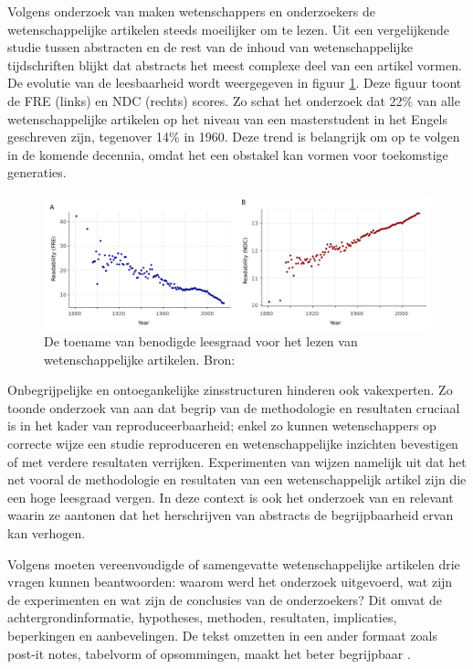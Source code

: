 \medspace

Volgens onderzoek van \textcite{PlavenSigray2017} maken wetenschappers en onderzoekers de wetenschappelijke artikelen steeds moeilijker om te lezen. Uit een vergelijkende studie tussen abstracten en de rest van de inhoud van wetenschappelijke tijdschriften blijkt dat abstracts het meest complexe deel van een artikel vormen. De evolutie van de leesbaarheid wordt weergegeven in figuur \ref{img:fre-ndc}. Deze figuur toont de FRE (links) en NDC (rechts) scores. Zo schat het onderzoek dat 22\% van alle wetenschappelijke artikelen op het niveau van een masterstudent in het Engels geschreven zijn, tegenover 14\% in 1960. Deze trend is belangrijk om op te volgen in de komende decennia, omdat het een obstakel kan vormen voor toekomstige generaties.

\begin{figure}[H]
	\includegraphics[width=\linewidth]{img/fre-ndc.png}
	\caption{De toename van benodigde leesgraad voor het lezen van wetenschappelijke artikelen. Bron: \autocite{PlavenSigray2017}}
	\label{img:fre-ndc}
\end{figure}

Onbegrijpelijke en ontoegankelijke zinsstructuren hinderen ook vakexperten. Zo toonde onderzoek van \textcite{McNutt2014} aan dat begrip van de methodologie en resultaten cruciaal is in het kader van reproduceerbaarheid; enkel zo kunnen wetenschappers op correcte wijze een studie reproduceren en wetenschappelijke inzichten bevestigen of met verdere resultaten verrijken. Experimenten van \textcite{Hubbard2017} wijzen namelijk uit dat het net vooral de methodologie en resultaten van een wetenschappelijk artikel zijn die een hoge leesgraad vergen. In deze context is ook het onderzoek van \textcite{Hartley1999} en \textcite{Snow2010} relevant waarin ze aantonen dat het herschrijven van abstracts de begrijpbaarheid ervan kan verhogen.

\medspace

Volgens \textcite{Hollenkamp2020, McCombes2022} moeten vereenvoudigde of samengevatte wetenschappelijke artikelen drie vragen kunnen beantwoorden: waarom werd het onderzoek uitgevoerd, wat zijn de experimenten en wat zijn de conclusies van de onderzoekers? Dit omvat de achtergrondinformatie, hypotheses, methoden, resultaten, implicaties, beperkingen en aanbevelingen. De tekst omzetten in een ander formaat zoals post-it notes, tabelvorm of opsommingen, maakt het beter begrijpbaar \autocite{Rijkhoff2022}. 

